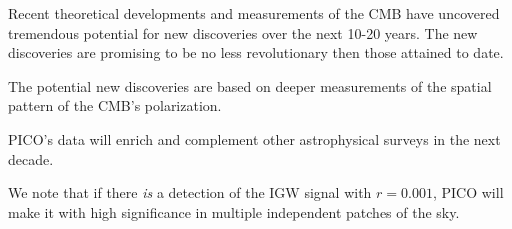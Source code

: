 \documentclass[PICOReport.tex]{subfiles}
\begin{document}
Recent theoretical developments and measurements of the \ac{CMB} have uncovered tremendous potential for new discoveries over the next 10-20 years. The new discoveries are promising to be no less revolutionary then those attained to date. 

The potential new discoveries are based on deeper measurements of the spatial pattern of the CMB's polarization.


PICO's data will enrich and complement other astrophysical surveys in the next decade.

We note that if there {\it is} a detection of the \ac{IGW} signal with $r=0.001$, PICO will make it with high significance in multiple independent patches of the sky. 
\end{document}
